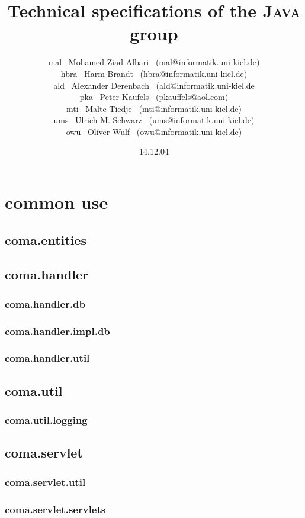 \documentclass[10pt]{article}
\title{Technical specifications of the \textsc{Java} group}
\date{14.12.04}
\author{mal \ Mohamed Ziad Albari \ (mal@informatik.uni-kiel.de)\\
hbra \ Harm Brandt \ (hbra@informatik.uni-kiel.de)\\
ald \ Alexander Derenbach \ (ald@informatik.uni-kiel.de\\
pka \ Peter Kaufels \ (pkauffels@aol.com)\\
mti \ Malte Tiedje \ (mti@informatik.uni-kiel.de) \\
ums \ Ulrich M. Schwarz \ (ums@informatik.uni-kiel.de) \\
owu \ Oliver Wulf \ (owu@informatik.uni-kiel.de)}
\begin{document}
\maketitle
\tableofcontents
\newpage


\section{common use}

\subsection{coma.entities}
\subsection{coma.handler}
\subsubsection{coma.handler.db}
\subsubsection{coma.handler.impl.db}
\subsubsection{coma.handler.util}
\subsection{coma.util}
\subsubsection{coma.util.logging}
\subsection{coma.servlet}
\subsubsection{coma.servlet.util}
\subsubsection{coma.servlet.servlets}
\end{document}

